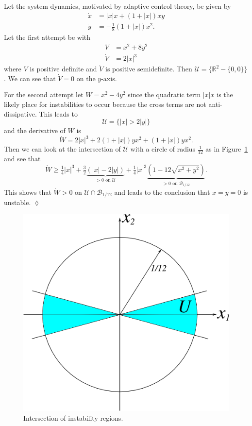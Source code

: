 \begin{example}
Let the system dynamics, motivated by adaptive control theory, be given by
\begin{align*}
\dot{x} &= |x|x + (1+|x|)xy \\
\dot{y} &= -\tfrac{1}{8}(1+|x|)x^2.
\end{align*}
Let the first attempt be with
\begin{align*}
V &= x^2 + 8y^2 \\
\dot{V} &= 2|x|^3
\end{align*}
where $V$ is positive definite and $\dot{V}$ is positive semidefinite.
Then $\mathcal{U} = \{\mathbb{R}^2 - \{0,0\}\}$.
We can see that $\dot{V} = 0$ on the $y$-axis.

For the second attempt let $W=x^2-4y^2$ since the quadratic term $|x|x$ is the likely place for instabilities to occur because the cross terms are not anti-dissipative.
This leads to
$$\mathcal{U} = \{|x|>2|y|\}$$
and the derivative of $W$ is
$$\dot{W} = 2|x|^3 + 2(1+|x|)yx^2 + (1+|x|)yx^2.$$
Then we can look at the intersection of $\mathcal{U}$ with a circle of radius $\tfrac{1}{12}$ as in Figure~\ref{fig:10unstableW} and see that
$$\dot{W} \geq \tfrac{1}{4}|x|^3 + \tfrac{3}{2}\underbrace{(|x|-2|y|)}_{>0\text{\ on\ }\mathcal{U}} + \tfrac{1}{4}|x|^3
  \underbrace{(1-12\sqrt{x^2+y^2})}_{>0\text{\ on\ }\mathcal{B}_{1/12}}.$$
This shows that $\dot{W}>0$ on $\mathcal{U}\cap\mathcal{B}_{1/12}$ and leads to the conclusion that $x=y=0$ is unstable.
$\lozenge$
\end{example}

\begin{figure}[ht!]
\centering
\includegraphics[width=.4\textwidth]{images/10unstableW}
\caption{Intersection of instability regions.}
\label{fig:10unstableW}
\end{figure}
